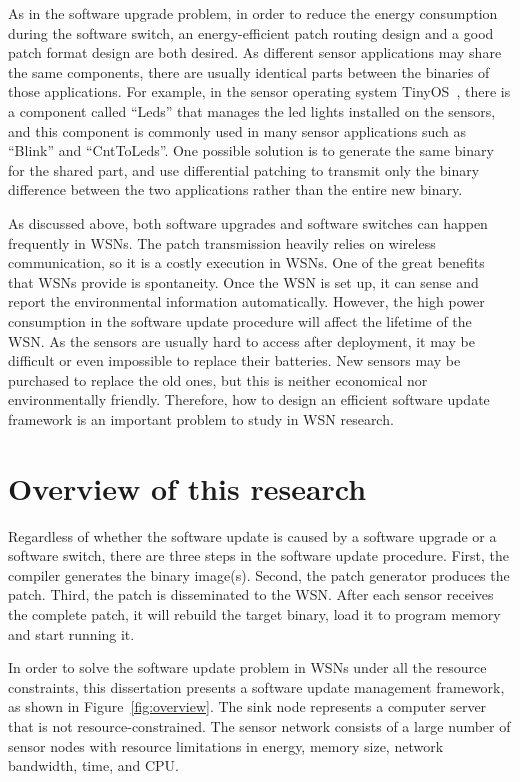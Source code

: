 As in the software upgrade problem, in order to reduce the energy consumption during the software switch, an 
energy-efficient patch routing design and a good patch format design are both desired. 
As different sensor applications may share the same components, there are usually identical parts between the binaries 
of those applications. For example, in the sensor operating system TinyOS~\cite{tinyos}, there is a component called 
``Leds'' that manages the led lights installed on the sensors, and this component is commonly used in many sensor 
applications such as ``Blink'' and ``CntToLeds''. 
One possible solution is to generate the same binary for the shared part, and use differential patching to transmit 
only the binary difference between the two applications rather than the entire new binary.

As discussed above, both software upgrades and software switches can happen frequently in WSNs. The patch transmission 
heavily relies on wireless communication, so it is a costly execution in WSNs.
One of the great benefits that WSNs provide is spontaneity. Once the WSN is set up, it can sense and report
the environmental information automatically.
However, the high power consumption in the software update procedure will affect the lifetime of the WSN.
As the sensors are usually hard to access after deployment, it may be difficult or even impossible to replace their 
batteries. New sensors may be purchased to replace the old ones, but this is neither economical nor environmentally 
friendly.
Therefore, how to design an efficient software update framework is an important problem to study in WSN research.

\section{Overview of this research}

Regardless of whether the software update is caused by a software upgrade or a software switch, there are three steps 
in the software update procedure.
First, the compiler generates the binary image(s).
Second, the patch generator produces the patch.
Third, the patch is disseminated to the WSN.
After each sensor receives the complete patch, it will rebuild the target binary, load it to program memory and start 
running it.

In order to solve the software update problem in WSNs under all the resource constraints, this dissertation presents a 
software update management framework, as shown in Figure~\ref{fig:overview}. 
The sink node represents a computer server that is not resource-constrained. The sensor network consists of a large 
number of sensor nodes with resource limitations in energy, memory size, network bandwidth, time, and CPU.

